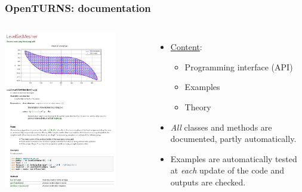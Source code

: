 \documentclass{beamer}
\begin{document}
    \begin{frame}[containsverbatim]
      \frametitle{OpenTURNS: documentation}

      \small{

      \begin{columns}

          \begin{center}
          \includegraphics[width=0.8\textwidth]{figures/exClasses.png}
          \end{center}


        \begin{itemize}
        \item \underline{Content}:
        \begin{itemize}
        \item Programming interface (API)
        \item Examples
        \item Theory
        \end{itemize}
        \item \emph{All} classes and methods
        are documented, partly automatically.
        \item Examples are automatically tested at \emph{each} update
        of the code and outputs are checked.
        \end{itemize}

      \end{columns}

      }
    \end{frame}
\end{document}
